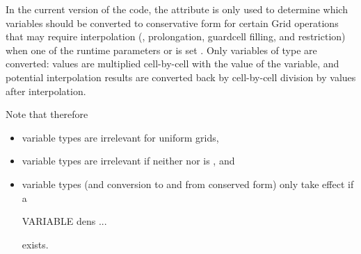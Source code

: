 \begin{itemize}
\begin{itemize}
\begin{comment}
Variables $\{Q_i\}$ marked with the \code{RENORM} property obey the constraint
\begin{equation}
\sum_i Q_i = 1~.
\end{equation}
\item \code{CONSERVE/NOCONSERVE}\\
Variables marked with the \code{CONSERVE} property obey conservation laws
(\eg, momentum vs. velocity).
\end{comment}
\end{itemize}
In the current version of the
code, the  attribute is only used to determine
which variables should be converted to conservative form
for certain \unit{Grid} operations that may require
interpolation (\ie, prolongation, guardcell filling, and restriction)
when one of the runtime parameters
\newline  %
 or
 is set .
Only variables of type  are converted: values
are multiplied cell-by-cell with the value of the 
variable, and potential interpolation results are converted
back by cell-by-cell division by  values after
interpolation.

Note that therefore
\begin{itemize}
\item variable types are irrelevant for uniform grids,
\item variable types are irrelevant if
neither  nor
\newline  %
 is , and
\item variable types (and conversion to and from conserved form)
only take effect if a \begin{codeseg}
VARIABLE dens ...
\end{codeseg}
exists.
\end{itemize}


\end{itemize}
